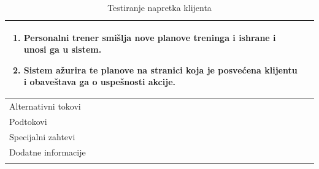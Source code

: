 \begin{longtable}{| p{} | p{} |}
\begin{enumerate}
    \item Personalni trener smišlja nove planove treninga i ishrane i unosi ga u sistem.
    \item Sistem ažurira te planove na stranici koja je posvećena klijentu i obaveštava ga o uspešnosti akcije.
    \end{enumerate}\\
\hline
    Alternativni tokovi & \\
\hline
    Podtokovi & \\
\hline
    Specijalni zahtevi & \\
\hline
    Dodatne informacije & \\
\hline
\caption{Testiranje napretka klijenta} 
\end{longtable}